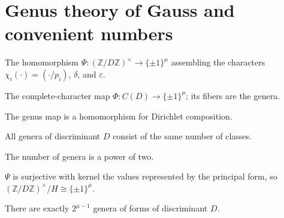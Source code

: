 \section{Genus theory of Gauss and convenient numbers}

\begin{definition}
  \label{def:assigned_characters}
  \leanok
  The homomorphism $\Psi:(\mathbb Z/D\mathbb Z)^\times \to \{\pm1\}^\mu$ assembling
  the characters $\chi_i(\cdot)=(\cdot/p_i)$, $\delta$, and $\varepsilon$.
\end{definition}

\begin{definition}
  \label{def:genus_map}
  \leanok
  The complete-character map $\Phi:C(D)\to\{\pm1\}^\mu$; its fibers are the genera.
\end{definition}

\begin{lemma}
  \label{lem:l3_13}
  \leanok
  The genus map is a homomorphism for Dirichlet composition.
\end{lemma}

\begin{theorem}
  \label{cor:c3_14_i}
  \leanok
  All genera of discriminant $D$ consist of the same number of classes.
\end{theorem}

\begin{theorem}
  \label{cor:c3_14_ii}
  \leanok
  The number of genera is a power of two.
\end{theorem}

\begin{lemma}
  \label{lem:l3_17}
  \leanok
  $\Psi$ is surjective with kernel the values represented by the principal form, so
  $(\mathbb Z/D\mathbb Z)^\times/H \cong \{\pm1\}^\mu$.
\end{lemma}

\begin{theorem}
  \label{thm:t3_15_i}
  \leanok
  There are exactly $2^{\mu-1}$ genera of forms of discriminant $D$.
\end{theorem}

